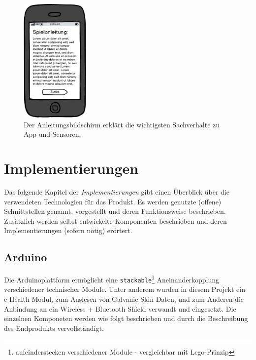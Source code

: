 \documentclass[10pt, a4paper, oneside, titlepage]{scrartcl} %
\begin{document}
	\begin{figure}[ht!]
		\begin{center}
			\includegraphics[width=0.3\textwidth]{mockup_13_instructions.png}
		\end{center}
		\caption[Mockup Anleitungsbildschirm]{Der Anleitungsbildschirm erklärt die wichtigsten Sachverhalte zu App und Sensoren.}
		\label{fig:mockup_13}
	\end{figure}	

   	
   	\newpage
	\section{Implementierungen}

	Das folgende Kapitel der \textit{Implementierungen} gibt einen Überblick über die verwendeten Technologien für das Produkt. Es werden genutzte (offene) Schnittstellen genannt, vorgestellt und deren Funktionsweise beschrieben. Zusätzlich werden selbst entwickelte Komponenten beschrieben und deren Implementierungen (sofern nötig) erörtert.
	
	\subsection{Arduino}
	
	Die Arduinoplattform ermöglicht eine \texttt{stackable}\footnote{aufeinderstecken verschiedener Module - vergleichbar mit Lego-Prinzip} Aneinanderkopplung verschiedener technischer Module. Unter anderem wurden in diesem Projekt ein e-Health-Modul, zum Auslesen von Galvanic Skin Daten, und zum Anderen die Anbindung an ein Wireless + Bluetooth Shield verwandt und eingesetzt. Die einzelnen Komponeten werden wie folgt beschrieben und durch die Beschreibung des Endprodukts vervollständigt.
		
\end{document}
